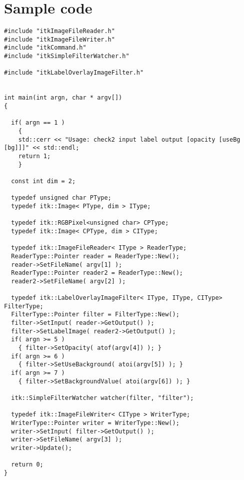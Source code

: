 \documentclass{InsightArticle}
\begin{document}
\section{Sample code}

\small \begin{verbatim}
#include "itkImageFileReader.h"
#include "itkImageFileWriter.h"
#include "itkCommand.h"
#include "itkSimpleFilterWatcher.h"

#include "itkLabelOverlayImageFilter.h"


int main(int argn, char * argv[])
{

  if( argn == 1 )
    {
    std::cerr << "Usage: check2 input label output [opacity [useBg [bg]]]" << std::endl;
    return 1;
    }

  const int dim = 2;
  
  typedef unsigned char PType;
  typedef itk::Image< PType, dim > IType;

  typedef itk::RGBPixel<unsigned char> CPType;
  typedef itk::Image< CPType, dim > CIType;

  typedef itk::ImageFileReader< IType > ReaderType;
  ReaderType::Pointer reader = ReaderType::New();
  reader->SetFileName( argv[1] );
  ReaderType::Pointer reader2 = ReaderType::New();
  reader2->SetFileName( argv[2] );

  typedef itk::LabelOverlayImageFilter< IType, IType, CIType> FilterType;
  FilterType::Pointer filter = FilterType::New();
  filter->SetInput( reader->GetOutput() );
  filter->SetLabelImage( reader2->GetOutput() );
  if( argn >= 5 )
    { filter->SetOpacity( atof(argv[4]) ); }
  if( argn >= 6 )
    { filter->SetUseBackground( atoi(argv[5]) ); }
  if( argn >= 7 )
    { filter->SetBackgroundValue( atoi(argv[6]) ); }

  itk::SimpleFilterWatcher watcher(filter, "filter");

  typedef itk::ImageFileWriter< CIType > WriterType;
  WriterType::Pointer writer = WriterType::New();
  writer->SetInput( filter->GetOutput() );
  writer->SetFileName( argv[3] );
  writer->Update();

  return 0;
}

\end{verbatim} \normalsize


\end{document}
